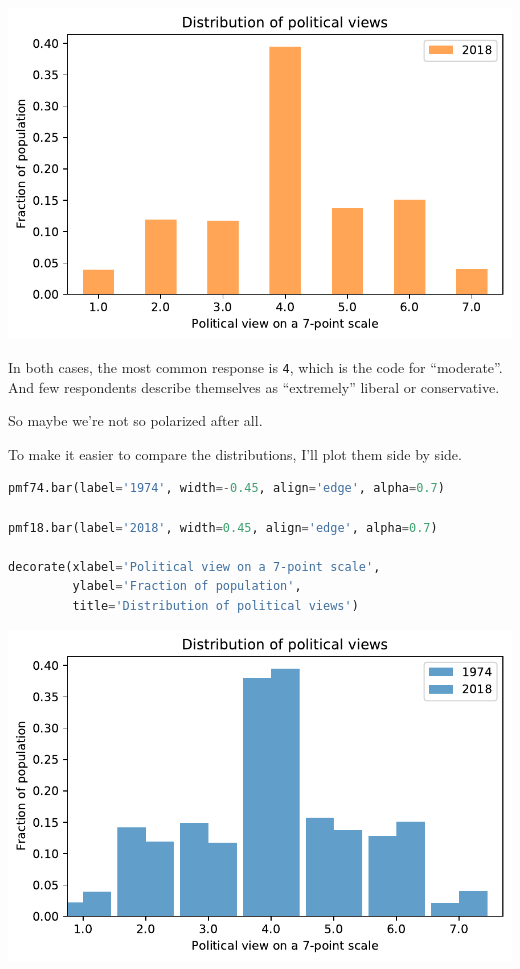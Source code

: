 \begin{center}
\includegraphics[scale=0.75]{02_polviews_files/02_polviews_32_0.pdf}
\end{center}

In both cases, the most common response is \passthrough{\lstinline!4!},
which is the code for ``moderate''. And few respondents describe
themselves as ``extremely'' liberal or conservative.

So maybe we're not so polarized after all.

To make it easier to compare the distributions, I'll plot them side by
side.

\begin{lstlisting}[language=Python,style=source]
pmf74.bar(label='1974', width=-0.45, align='edge', alpha=0.7)

pmf18.bar(label='2018', width=0.45, align='edge', alpha=0.7)

decorate(xlabel='Political view on a 7-point scale',
         ylabel='Fraction of population',
         title='Distribution of political views')
\end{lstlisting}

\begin{center}
\includegraphics[scale=0.75]{02_polviews_files/02_polviews_34_0.pdf}
\end{center}

